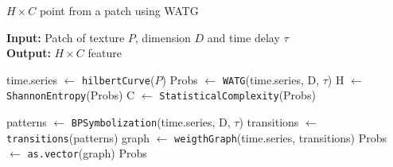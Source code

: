 \documentclass[journal]{IEEEtran}
\begin{document}
\begin{algorithm}[h]
	\caption{$H \times C$ point from a patch using WATG}
	\label{alg:watg}                                
	\textbf{Input:} Patch of texture $P$, dimension $D$ and time delay \textbf{$\tau$}\\
	\textbf{Output:} $H \times C$ feature
	\begin{algorithmic}[1]
		\State time.series $\gets$ \texttt{hilbertCurve}($P$)
		\State Probs $\gets$ \texttt{WATG}(time.series, D, $\tau$)
		\State H $\gets$ \texttt{ShannonEntropy}(Probs)
		\State C $\gets$ \texttt{StatisticalComplexity}(Probs)
		
		\vspace{0.15cm}
		
		\State patterns $\gets$ \texttt{BPSymbolization}(time.series, D, $\tau$)
		\State transitions $\gets$ \texttt{transitions}(patterns)
		\State graph $\gets$ \texttt{weigthGraph}(time.series, transitions)
		\State Probs $\gets$ \texttt{as.vector}(graph)
		\State \Return Probs
		\EndFunction
	\end{algorithmic}
\end{algorithm}
\end{document}

